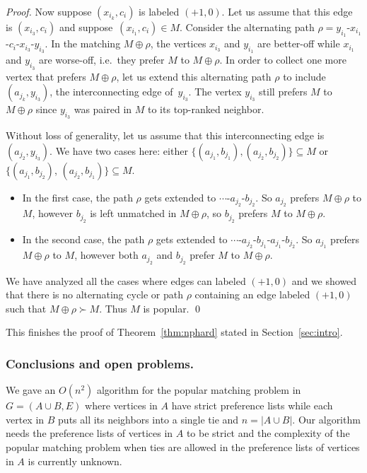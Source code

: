 \documentclass[11pt]{llncs}
\begin{document}
\begin{proof}
Now suppose $(x_{i_k},c_i)$ is labeled $(+1,0)$. Let us assume that this edge is $(x_{i_3},c_i)$ and suppose~$(x_{i_1},c_i) \in M$. 
Consider the alternating path $\rho = y_{i_1}$-$x_{i_1}$-$c_i$-$x_{i_3}$-$y_{i_3}$. In the matching $M \oplus \rho$, the vertices $x_{i_3}$ and
$y_{i_1}$ are better-off while $x_{i_1}$ and $y_{i_3}$ are worse-off, i.e.\ they prefer $M$ to  $M \oplus \rho$. In order to collect one
more vertex that prefers $M \oplus \rho$, let us extend this alternating path $\rho$ to include  $(a_{j_k},y_{i_3})$, the interconnecting edge 
of~$y_{i_3}$. The vertex $y_{i_3}$ still prefers $M$ to $M\oplus\rho$ since $y_{i_3}$ was paired in $M$ to its top-ranked neighbor.

Without loss of generality, let us assume that this interconnecting edge is $(a_{j_2},y_{i_3})$. 
We have two cases here: either $\{(a_{j_1}, b_{j_1}),(a_{j_2}, b_{j_2})\} \subseteq M$ or $\{(a_{j_1}, b_{j_2})$, $(a_{j_2}, b_{j_1})\} \subseteq M$. 
\begin{itemize}
\item In the first case, the path $\rho$ gets extended to $\cdots$-$a_{j_2}$-$b_{j_2}$. So $a_{j_2}$ prefers $M \oplus \rho$ to $M$, however
$b_{j_2}$ is left unmatched in $M\oplus\rho$, so $b_{j_2}$ prefers $M$ to $M\oplus\rho$.
\item In the second case, the path $\rho$ gets extended to $\cdots$-$a_{j_2}$-$b_{j_1}$-$a_{j_1}$-$b_{j_2}$. So $a_{j_1}$ prefers $M \oplus \rho$ 
to $M$, however both $a_{j_2}$ and $b_{j_2}$ prefer $M$ to $M\oplus\rho$.
\end{itemize}
We have analyzed all the cases where edges can labeled $(+1,0)$ and we showed that there is no alternating cycle or path $\rho$ containing an edge
labeled $(+1,0)$ such that $M \oplus \rho \succ M$. Thus $M$ is popular. \qed
\end{proof}
This finishes the proof of Theorem~\ref{thm:nphard} stated in Section~\ref{sec:intro}.

\subsubsection{Conclusions and open problems.} We gave an $O(n^2)$ algorithm for the popular 
matching problem in $G = (A \cup B,E)$ where vertices in $A$ have strict preference lists while 
each vertex in $B$ puts all its neighbors into a single tie and $n = |A \cup B|$.
Our algorithm needs the preference lists of vertices in $A$ to be strict and 
the complexity of the popular matching problem when ties are allowed in the preference lists of 
vertices in $A$ is currently unknown.  
\end{document}
